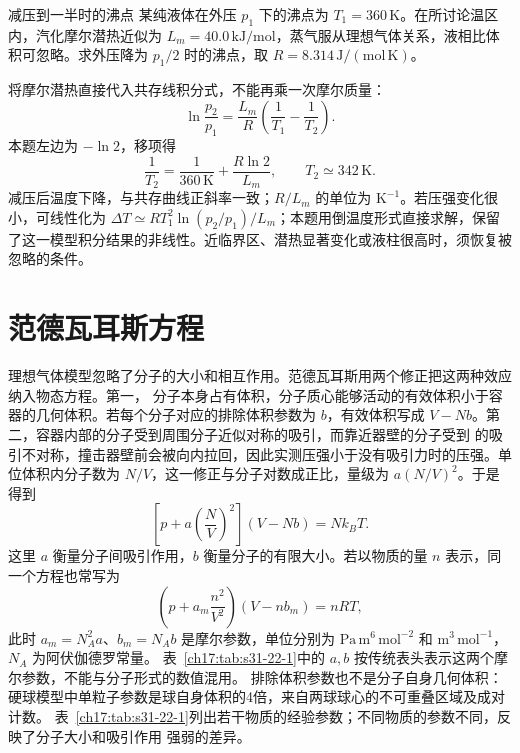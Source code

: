 {\Needspace{180pt}
\begin{origexamplebox}{减压到一半时的沸点}\label{ch17:ex:teaching-boiling}
某纯液体在外压 $p_1$ 下的沸点为 $T_1=360\,\mathrm K$。在所讨论温区内，汽化摩尔潜热近似为 $L_m=40.0\,\mathrm{kJ/mol}$，蒸气服从理想气体关系，液相比体积可忽略。求外压降为 $p_1/2$ 时的沸点，取 $R=8.314\,\mathrm{J/(mol\,K)}$。

\ThQBoiling
\end{origexamplebox}
\Needspace{65pt}
\begin{xesolution}
\ThABoiling

将摩尔潜热直接代入共存线积分式，不能再乘一次摩尔质量：
\[
 \ln\frac{p_2}{p_1}=\frac{L_m}{R}\left(\frac1{T_1}-\frac1{T_2}\right).
\]
本题左边为 $-\ln2$，移项得
\[
 \frac1{T_2}=\frac1{360\,\mathrm K}+\frac{R\ln2}{L_m},
 \qquad T_2\simeq342\,\mathrm K.
\]
减压后温度下降，与共存曲线正斜率一致；$R/L_m$ 的单位为 $\mathrm{K^{-1}}$。若压强变化很小，可线性化为 $\Delta T\simeq RT_1^2\ln(p_2/p_1)/L_m$；本题用倒温度形式直接求解，保留了这一模型积分结果的非线性。近临界区、潜热显著变化或液柱很高时，须恢复被忽略的条件。
\end{xesolution}

\section{范德瓦耳斯方程}

理想气体模型忽略了分子的大小和相互作用。范德瓦耳斯用两个修正把这两种效应纳入物态方程。第一，
分子本身占有体积，分子质心能够活动的有效体积小于容器的几何体积。若每个分子对应的排除体积参数为
$b$，有效体积写成 $V-Nb$。第二，容器内部的分子受到周围分子近似对称的吸引，而靠近器壁的分子受到
的吸引不对称，撞击器壁前会被向内拉回，因此实测压强小于没有吸引力时的压强。单位体积内分子数为
$N/V$，这一修正与分子对数成正比，量级为 $a(N/V)^2$。于是得到
\begin{equation}
  \boxed{\left[p+a\left(\frac{N}{V}\right)^2\right](V-Nb)=Nk_B T}.
  \label{ch17:eq:s31-22-1}
\end{equation}
这里 $a$ 衡量分子间吸引作用，$b$ 衡量分子的有限大小。若以物质的量 $n$ 表示，同一个方程也常写为
\[
  \left(p+a_m\frac{n^2}{V^2}\right)(V-nb_m)=nRT,
\]
此时 $a_m=N_A^2a$、$b_m=N_Ab$ 是摩尔参数，单位分别为
$\mathrm{Pa\,m^6\,mol^{-2}}$ 和 $\mathrm{m^3\,mol^{-1}}$，$N_A$ 为阿伏伽德罗常量。
表~\ref{ch17:tab:s31-22-1}中的 $a,b$ 按传统表头表示这两个摩尔参数，不能与分子形式的数值混用。
排除体积参数也不是分子自身几何体积：硬球模型中单粒子参数是球自身体积的4倍，来自两球球心的不可重叠区域及成对计数。
表~\ref{ch17:tab:s31-22-1}列出若干物质的经验参数；不同物质的参数不同，反映了分子大小和吸引作用
强弱的差异。

}
